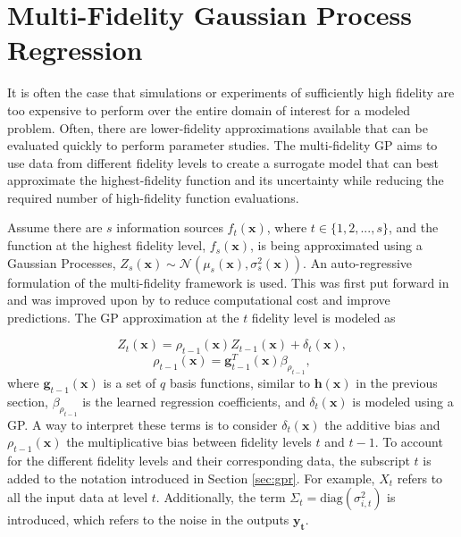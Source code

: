 \section{Multi-Fidelity Gaussian Process Regression} \label{sec:mf_modeling}

It is often the case that simulations or experiments of sufficiently high fidelity are too expensive to perform over the entire domain of interest for a modeled problem.
Often, there are lower-fidelity approximations available that can be evaluated quickly to perform parameter studies.
The multi-fidelity GP aims to use data from different fidelity levels to create a surrogate model that can best approximate the highest-fidelity function and its uncertainty while reducing the required number of high-fidelity function evaluations. 

Assume there are $s$ information sources $f_t(\mathbf{x})$, where $t\in\{1,2,...,s\}$, and the function at the highest fidelity level, $f_s(\mathbf{x})$, is being approximated using a Gaussian Processes, $Z_s(\mathbf{x}) \sim \mathcal{N}(\mu_{s}(\mathbf{x}), \sigma_s^2(\mathbf{x}))$.
An auto-regressive formulation of the multi-fidelity framework is used. This was first put forward in \cite{kennedy_predicting_2000} and was improved upon by \cite{gratiet_multi-fidelity_nodate} to reduce computational cost and improve predictions.
The GP approximation at the $t$ fidelity level is modeled as

\begin{equation}
    Z_t(\mathbf{x}) = \rho_{t-1}(\mathbf{x})Z_{t-1}(\mathbf{x}) + \delta_t(\mathbf{x}),
\end{equation}
\begin{equation}
    \rho_{t-1}(\mathbf{x}) = \mathbf{g}_{t-1}^T(\mathbf{x})\beta_{\rho_{t-1}},
\end{equation}
where $\mathbf{g}_{t-1}(\mathbf{x})$ is a set of $q$ basis functions, similar to $\mathbf{h}(\mathbf{x})$ in the previous section, $\beta_{\rho_{t-1}}$ is the learned regression coefficients, and $\delta_t(\mathbf{x})$ is modeled using a GP.
A way to interpret these terms is to consider $\delta_t(\mathbf{x})$ the additive bias and $\rho_{t-1}(\mathbf{x})$ the multiplicative bias between fidelity levels $t$ and $t-1$.
To account for the different fidelity levels and their corresponding data, the subscript $t$ is added to the notation introduced in Section \ref{sec:gpr}.
For example, $X_t$ refers to all the input data at level $t$. Additionally, the term $\Sigma_t = \text{diag}(\sigma^2_{i,t})$ is introduced, which refers to the noise in the outputs $\mathbf{y_t}$. 

